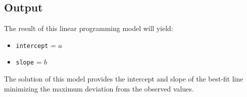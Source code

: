 \documentclass{article}
\begin{document}
\subsection*{Output}
The result of this linear programming model will yield:
\begin{itemize}
    \item \texttt{intercept} = \( a \)
    \item \texttt{slope} = \( b \)
\end{itemize}

The solution of this model provides the intercept and slope of the best-fit line minimizing the maximum deviation from the observed values.
\end{document}
